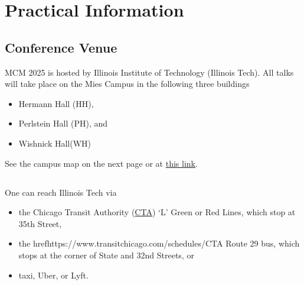 


\chapter{Practical Information}



\section{Conference Venue}
MCM 2025 is hosted by Illinois Institute of Technology (Illinois Tech).  All talks will take place on the Mies Campus in the following three buildings
\begin{itemize}
	\item Hermann Hall (HH),
	\item Perlstein Hall (PH), and
	\item Wishnick Hall(WH)
\end{itemize}
See the campus map on the next page or at \href{https://www.iit.edu/sites/default/files/2022-08/mies-campus-accessibility-map-2022.pdf}{this link}.  


\section{}
One can reach Illinois Tech via 
\begin{itemize}
	\item the Chicago Transit Authority (\href{https://www.transitchicago.com/schedules/}{CTA}) `L' Green or Red Lines, which stop at 35th Street, 
	\item the href{https://www.transitchicago.com/schedules/}{CTA} Route 29 bus, which stops at the corner of State and 32nd Streets, or
	\item taxi, Uber, or Lyft.
\end{itemize}



\clearpage

